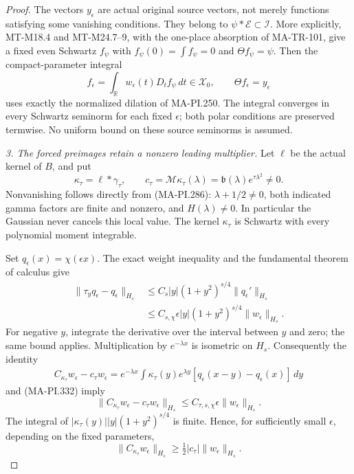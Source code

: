 \begin{proof}
The vectors \(y_\epsilon\) are actual original
source vectors, not merely functions satisfying
some vanishing conditions.  They belong to
\(\psi*\mathcal E\subset\mathscr I\).
More explicitly, MT-M18.4 and MT-M24.7--9,
with the one-place absorption of MA-TR-101,
give a fixed even Schwartz \(f_\psi\) with
\(f_\psi(0)=\int f_\psi=0\) and
\(\Theta f_\psi=\psi\).
Then the compact-parameter integral
\[
 f_\epsilon=\int_{\mathbb R}
                 w_\epsilon(t)D_t f_\psi\,dt
       \in\mathscr X_0,\qquad
       \Theta f_\epsilon=y_\epsilon
 \tag{MA-PI.330}
\]
uses exactly the normalized dilation of MA-PI.250.
The integral converges in every Schwartz seminorm
for each fixed \(\epsilon\); both polar conditions
are preserved termwise.  No uniform bound on these
source seminorms is assumed.

\emph{3. The forced preimages retain a nonzero leading multiplier.}
Let \(\ell\) be the actual kernel of \(B\), and put
\[
 \kappa_\tau=\ell*\gamma_\tau,\qquad
 c_\tau=\mathcal M\kappa_\tau(\lambda)
        =\mathfrak b(\lambda)e^{\tau\lambda^2}\ne0.
 \tag{MA-PI.331}
\]
Nonvanishing follows directly from (MA-PI.286):
\(\lambda+1/2\ne0\), both indicated gamma factors
are finite and nonzero, and \(H(\lambda)\ne0\).
In particular the Gaussian never cancels this
local value.  The kernel \(\kappa_\tau\) is
Schwartz with every polynomial moment integrable.

Set \(q_\epsilon(x)=\chi(\epsilon x)\).
The exact weight inequality and the fundamental
theorem of calculus give
\[
 \begin{aligned}
 \|\tau_y q_\epsilon-q_\epsilon\|_{H_s}
 &\le C_s|y|(1+y^2)^{s/4}\|q_\epsilon'\|_{H_s}\\
 &\le C_{s,\chi}\epsilon |y|(1+y^2)^{s/4}
                                      \|w_\epsilon\|_{H_s}.
 \end{aligned}
 \tag{MA-PI.332}
\]
For negative \(y\), integrate the derivative over
the interval between \(y\) and zero; the same
bound applies.  Multiplication by \(e^{-\lambda x}\)
is isometric on \(H_s\).  Consequently the identity
\[
 \begin{split}
 C_{\kappa_\tau}w_\epsilon-c_\tau w_\epsilon
   =e^{-\lambda x}\int \kappa_\tau(y)e^{\lambda y}
                [q_\epsilon(x-y)-q_\epsilon(x)]\,dy
 \end{split}
 \tag{MA-PI.333}
\]
and (MA-PI.332) imply
\[
 \|C_{\kappa_\tau}w_\epsilon-c_\tau w_\epsilon\|_{H_s}
       \le C_{\tau,s,\chi}\epsilon\|w_\epsilon\|_{H_s}.
 \tag{MA-PI.334}
\]
The integral of
\(|\kappa_\tau(y)||y|(1+y^2)^{s/4}\)
is finite.  Hence, for sufficiently small
\(\epsilon\), depending on the fixed parameters,
\[
       \|C_{\kappa_\tau}w_\epsilon\|_{H_s}
                    \ge \tfrac12|c_\tau|
                                      \|w_\epsilon\|_{H_s}.
 \tag{MA-PI.335}
\]


\end{proof}
